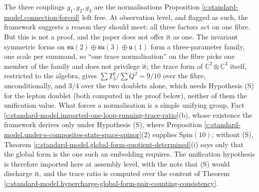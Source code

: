 \documentclass[11pt]{article}
\theoremstyle{definition}
\theoremstyle{plain}
\providecommand{\C}{}\renewcommand{\C}{\mathbb{C}}
\providecommand{\su}{}\renewcommand{\su}{\mathfrak{su}}
\providecommand{\uu}{}\renewcommand{\uu}{\mathfrak{u}}
\begin{document}
\label{c:note.standard-model.setting-unification-desert}
The three couplings $g_{1}, g_{2}, g_{3}$ are the normalisations Proposition \ref{c:standard-model.connection-forced} left free. At observation level, and flagged as such, the framework suggests a reason they should meet: all three factors act on one fibre. But this is not a proof, and the paper does not offer it as one. The invariant symmetric forms on $\su(2) \oplus \su(3) \oplus \uu(1)$ form a three-parameter family, one scale per summand, so ``one trace normalisation'' on the fibre picks one member of the family and does not privilege it; the trace form of $\C^{2} \otimes \C^{3}$ itself, restricted to the algebra, gives $\sum T_{3}^{2}/\sum Q^{2} = 9/10$ over the fibre, unconditionally, and $3/4$ over the two doublets alone, which needs Hypothesis (S) for the lepton doublet (both computed in the proof below), neither of them the unification value. What forces a normalisation is a simple unifying group, Fact \ref{c:standard-model.imported-one-loop-running-trace-ratio}(b), whose existence the framework derives only under Hypothesis (S), where Proposition \ref{c:standard-model.under-s-composites-state-space-spinor}(2) supplies $\mathrm{Spin}(10)$; without (S), Theorem \ref{c:standard-model.global-form-quotient-determined}(i) says only that the global form is the one such an embedding requires. The unification hypothesis is therefore imported here at assembly level, with the note that (S) would discharge it, and the trace ratio is computed over the content of Theorem \ref{c:standard-model.hypercharge-global-form-pair-counting-consistency}.
\end{document}
